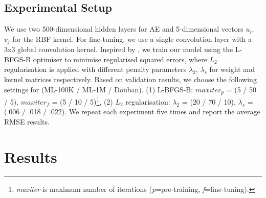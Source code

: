 \documentclass[sigconf]{acmart}
\begin{document}
\subsection{Experimental Setup}
We use two 500-dimensional hidden layers for AE and 5-dimensional vectors $u_i$, $v_j$ for the RBF kernel. For fine-tuning, we use a single convolution layer with a 3x3 global convolution kernel. Inspired by \cite{sedhain2015autorec}, we train our model using the L-BFGS-B optimiser to minimise regularised squared errors, where $L_{2}$ regularisation is applied with different penalty parameters $\lambda_2$, $\lambda_s$ for weight and kernel matrices respectively. Based on validation results, we choose the following settings for (ML-100K / ML-1M / Douban). (1) L-BFGS-B: \textit{$maxiter_{p}$} = (5 / 50 / 5), \textit{$maxiter_{f}$} = (5 / 10 / 5)\footnote{\textit{maxiter} is maximum number of iterations (\textit{p}=pre-training, \textit{f}=fine-tuning).}, (2) $L_2$ regularisation: $\lambda_2$ = (20 / 70 / 10), $\lambda_s$ = (.006 / .018 / .022). We repeat each experiment five times and report the average RMSE results.

\section{Results}
\end{document}
